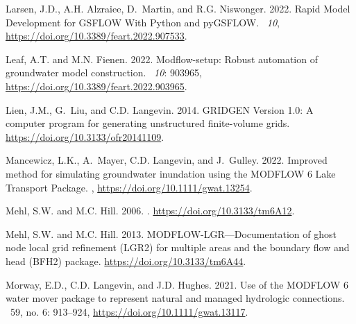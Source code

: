 \documentclass[12pt, oneside]{article}  	%
\begin{document}
\begin{thebibliography}{}
Larsen, J.D., A.H. Alzraiee, D.~Martin, and R.G. Niswonger. 2022.
\newblock Rapid Model Development for GSFLOW With Python and pyGSFLOW.
~{\em 10},
  \url{https://doi.org/10.3389/feart.2022.907533}.

Leaf, A.T. and M.N. Fienen. 2022.
\newblock Modflow-setup: Robust automation of groundwater model construction.
~{\em 10}: 903965,
  \url{https://doi.org/10.3389/feart.2022.903965}.

Lien, J.M., G.~Liu, and C.D. Langevin. 2014.
\newblock GRIDGEN Version 1.0: A computer program for generating unstructured
  finite-volume grids.
  \url{https://doi.org/10.3133/ofr20141109}.

Mancewicz, L.K., A.~Mayer, C.D. Langevin, and J.~Gulley. 2022.
\newblock Improved method for simulating groundwater inundation using the
  MODFLOW 6 Lake Transport Package.
, \url{https://doi.org/10.1111/gwat.13254}.

Mehl, S.W. and M.C. Hill. 2006.
.
 \url{https://doi.org/10.3133/tm6A12}.

Mehl, S.W. and M.C. Hill. 2013.
\newblock MODFLOW-LGR---Documentation of ghost node local grid refinement
  (LGR2) for multiple areas and the boundary flow and head (BFH2) package.
 \url{https://doi.org/10.3133/tm6A44}.

Morway, E.D., C.D. Langevin, and J.D. Hughes. 2021.
\newblock Use of the {MODFLOW 6} water mover package to represent natural and
  managed hydrologic connections.
~59, no. 6: 913--924,
  \url{https://doi.org/10.1111/gwat.13117}.


\end{thebibliography}
\end{document}
